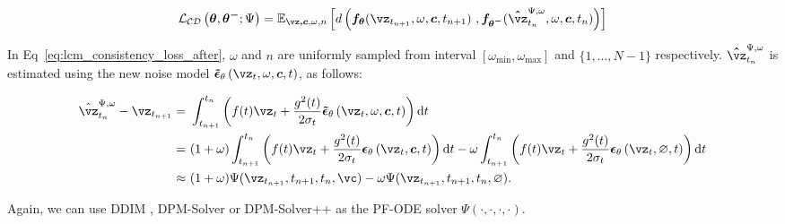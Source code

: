 \documentclass{article} %
\newcommand{\jian}[1]{\textcolor{red}{#1}}
\begin{document}
\begin{small}
\begin{equation}
\mathcal{L_{CD}}\left(\boldsymbol{\theta},\boldsymbol{\theta^-};\Psi\right) = \mathbb{E}_{\boldsymbol{\vz,c},\omega,n}\left[d\left(\boldsymbol{f_\theta}(\boldsymbol{\vz}_{t_{n+1}}, \omega, \boldsymbol{c}, t_{n+1})\ , \boldsymbol{f_{\theta^-}}(\boldsymbol{\hat{\vz}}^{\Psi,\omega}_{t_{n}}, \omega, \boldsymbol{c}, t_{n})\right)\right]
\label{eq:lcm_consistency_loss_after}
\end{equation}
\end{small}
In Eq~\ref{eq:lcm_consistency_loss_after}, $\omega$ and $n$ are uniformly sampled from
interval $[\omega_{\text{min}},\omega_{\text{max}}]$ and $\{1,\ldots, N-1\}$ respectively.
$\boldsymbol{\hat{\vz}}^{\Psi,\omega}_{t_{n}}$ is estimated using the new noise model 
$\boldsymbol{\tilde{\epsilon}}_{\theta}\left(\boldsymbol{\vz}_t, \omega, \boldsymbol{c},  t\right)$, as follows:
\begin{footnotesize}
\begin{equation}
\begin{aligned}
    \hat{\vz}^{\Psi, \omega}_{t_n} - \boldsymbol{\vz}_{t_{n+1}} = & \ \int_{t_{n+1}}^{t_n}\left(f(t) \boldsymbol{\vz}_t+\frac{g^2(t)}{2 \sigma_t} \boldsymbol{\tilde{\epsilon}}_{\theta}\left(\boldsymbol{\vz}_t, \omega, \boldsymbol{c},  t\right)\right) \mathrm{d}t \\
    =& \ (1+\omega)\int_{t_{n+1}}^{t_n}\left(f(t) \boldsymbol{\vz}_t+\frac{g^2(t)}{2 \sigma_t} \boldsymbol{\epsilon}_{\theta}\left(\boldsymbol{\vz}_t, \boldsymbol{c},  t\right)\right) \mathrm{d}t  - \omega\int_{t_{n+1}}^{t_n}\left(f(t) \boldsymbol{\vz}_t+\frac{g^2(t)}{2 \sigma_t} \boldsymbol{\epsilon}_{\theta}\left(\boldsymbol{\vz}_t, \varnothing,  t\right)\right) \mathrm{d}t\\
    \approx & \  (1+\omega)\Psi(\vz_{t_{n+1}},t_{n+1}, t_n, \vc)- \omega\Psi(\vz_{t_{n+1}},t_{n+1}, t_n, \varnothing).
    \label{eq:aug_pf_ode_estimate}
\end{aligned}
\end{equation}
\end{footnotesize}
Again, we can use DDIM \citep{song2020denoising}, DPM-Solver \citep{lu2022dpm} or DPM-Solver++ \citep{lu2022dpm++} as the PF-ODE solver $\Psi(\cdot,\cdot,\cdot,\cdot)$.
\end{document}
